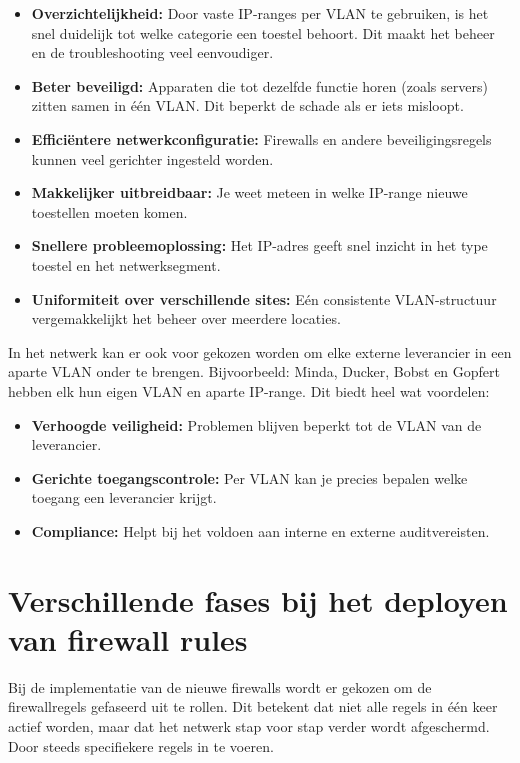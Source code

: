\begin{itemize}
    \item \textbf{Overzichtelijkheid:} Door vaste IP-ranges per VLAN te gebruiken, is het snel duidelijk tot welke categorie een toestel behoort. Dit maakt het beheer en de troubleshooting veel eenvoudiger.
    \item \textbf{Beter beveiligd:} Apparaten die tot dezelfde functie horen (zoals servers) zitten samen in één VLAN. Dit beperkt de schade als er iets misloopt.
    \item \textbf{Efficiëntere netwerkconfiguratie:} Firewalls en andere beveiligingsregels kunnen veel gerichter ingesteld worden.
    \item \textbf{Makkelijker uitbreidbaar:} Je weet meteen in welke IP-range nieuwe toestellen moeten komen.
    \item \textbf{Snellere probleemoplossing:} Het IP-adres geeft snel inzicht in het type toestel en het netwerksegment.
    \item \textbf{Uniformiteit over verschillende sites:} Eén consistente VLAN-structuur vergemakkelijkt het beheer over meerdere locaties.
\end{itemize}

In het netwerk kan er ook voor gekozen worden om elke externe leverancier in een aparte VLAN onder te brengen. Bijvoorbeeld: Minda, Ducker, Bobst en Gopfert hebben elk hun eigen VLAN en aparte IP-range. Dit biedt heel wat voordelen:

\begin{itemize}
    \item \textbf{Verhoogde veiligheid:} Problemen blijven beperkt tot de VLAN van de leverancier.
    \item \textbf{Gerichte toegangscontrole:} Per VLAN kan je precies bepalen welke toegang een leverancier krijgt.
    \item \textbf{Compliance:} Helpt bij het voldoen aan interne en externe auditvereisten.
\end{itemize}

\section{Verschillende fases bij het deployen van firewall rules}

Bij de implementatie van de nieuwe firewalls wordt er gekozen om de firewallregels gefaseerd uit te rollen. Dit betekent dat niet alle regels in één keer actief worden, maar dat het netwerk stap voor stap verder wordt afgeschermd. Door steeds specifiekere regels in te voeren.

